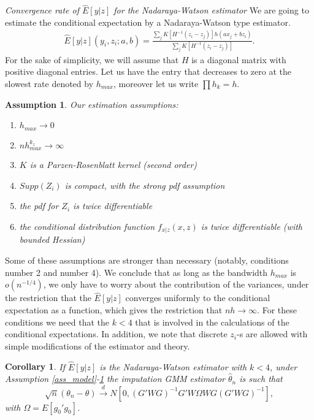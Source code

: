 \documentclass{article}
\newtheorem{assumption}{Assumption}
\newtheorem{corollary}{Corollary}
\theoremstyle{definition}
\theoremstyle{remark}
\begin{document}
\emph{Convergence rate of $\hat{E}[y|z]$ for the Nadaraya-Watson estimator}
We are going to estimate the conditional expectation by a Nadaraya-Watson type estimator.
\begin{align}
    \hat{E}[y|z](y_i, z_i; a,b)= \frac{\sum_j K[H^{-1}(z_i-z_j)] h(a x_j + b z_i)}{\sum_j K[H^{-1}(z_i-z_j)]}.
\end{align}
For the sake of simplicity, we will assume that $H$ is a diagonal matrix with positive diagonal entries. Let us have the entry that decreases to zero at the slowest rate denoted by $h_{max}$, moreover let us write $\prod h_k= h$.

\begin{assumption}\label{ass_estimation}
    Our estimation assumptions:
    \begin{enumerate}
        \item $h_{max}\rightarrow 0$
        \item $nh_{max}^{k_z}\rightarrow \infty$
        \item $K$ is a Parzen-Rosenblatt kernel (second order)
        \item $Supp(Z_i)$ is compact, with the strong pdf assumption
        \item the pdf for $Z_i$ is twice differentiable
        \item the conditional distribution function $f_{x|z}(x,z)$ is twice differentiable (with bounded Hessian)
    \end{enumerate}
\end{assumption}
Some of these assumptions are stronger than necessary (notably, conditions number 2 and number 4). We conclude that as long as the bandwidth $h_{max}$ is $o(n^{-1/4})$, we only have to worry about the contribution of the variances, under the restriction that the $\hat{E}[y|z]$ converges uniformly to the conditional expectation as a function, which gives the restriction that $nh \rightarrow \infty$. For these conditions we need that the $k<4$ that is involved in the calculations of the conditional expectations. In addition, we note that discrete $z_i$-s are allowed with simple modifications of the estimator and theory.
\begin{corollary}\label{cor_NWTheory}
	If $\hat{E}[y|z]$ is the Nadaraya-Watson estimator with $k<4$, under Assumption \ref{ass_model}-\ref{ass_estimation} the imputation GMM estimator $\hat{\theta}_n$ is such that
		\[\sqrt{n}(\theta_n-\theta) \stackrel{d}{\rightarrow} N[0, (G'WG)^{-1}G'W \Omega W G (G'WG)^{-1}],
	\]
	with $\Omega= E[g_0'g_0]$. 
\end{corollary}
\end{document}
